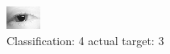 \begin{figure}[h!]
\begin{center}
\includegraphics[width=0.60\columnwidth]{figures/ID28_class_4_target_3.png}
\end{center}
\caption{ Classification: 4 actual target: 3}
\label{fig:ID28_class_4_target_3}
\end{figure}
